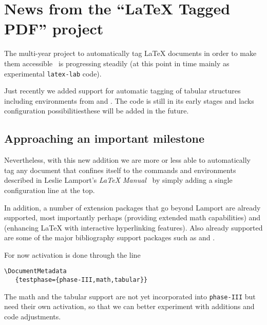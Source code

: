 \documentclass{ltnews}
\providecommand\Dash {\unskip \textemdash}
\providecommand\tubcommand[1]{}
\begin{document}
\tubcommand{\addtolength\textheight{4.2pc}}   %

\maketitle
{  \spaceskip=3.33pt 
\tableofcontents}

\setlength{}

\medskip



\section{News from the \enquote{\LaTeX{} Tagged PDF} project}

The multi-year project to automatically tag \LaTeX{} documents in
order to make them accessible~\cite{38:blueprint} is progressing steadily (at this
point in time mainly as experimental \texttt{latex-lab} code).

Just recently we added support for automatic tagging of tabular
structures including environments from  and
. The code is still in its early stages and lacks
configuration possibilities\Dash these will be added in the future.

\subsection{Approaching an important milestone}

Nevertheless, with this new addition we are more or less able to
automatically tag any document that confines itself to the commands
and environments described in Leslie Lamport's \emph{\LaTeX{}
Manual}~\cite{38:Lamport} by simply adding a single configuration line at the
top.

In addition, a number of extension packages that go beyond Lamport are
already supported, most importantly perhaps  (providing
extended math capabilities) and  (enhancing \LaTeX{} with
interactive hyperlinking features). Also already supported are some of the
major bibliography support packages such as  and
.

For now activation is done through the line
\begin{verbatim}
\DocumentMetadata
   {testphase={phase-III,math,tabular}}
\end{verbatim}
The math and the tabular support are not yet incorporated into
\texttt{phase-III} but need their own activation, so that we can
better experiment with additions and code adjustments.
\end{document}
